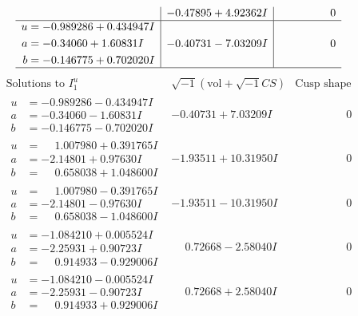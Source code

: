 \documentclass[1p]{elsarticle_modified}
\theoremstyle{definition}
\newcommand{\I}{\sqrt{-1}}
\begin{document}
$$\begin{array}{c|c|c}
 & -0.47895 + 4.92362 I & \phantom{-0.000000 } 0 \\ \hline\begin{aligned}
u &= -0.989286 + 0.434947 I \\
a &= -0.34060 + 1.60831 I \\
b &= -0.146775 + 0.702020 I\end{aligned}
 & -0.40731 - 7.03209 I & \phantom{-0.000000 } 0\\
 \hline 
 \end{array}$$\newpage$$\begin{array}{c|c|c}  
\text{Solutions to }I^u_{1}& \I (\text{vol} + \sqrt{-1}CS) & \text{Cusp shape}\\
 \hline 
\begin{aligned}
u &= -0.989286 - 0.434947 I \\
a &= -0.34060 - 1.60831 I \\
b &= -0.146775 - 0.702020 I\end{aligned}
 & -0.40731 + 7.03209 I & \phantom{-0.000000 } 0 \\ \hline\begin{aligned}
u &= \phantom{-}1.007980 + 0.391765 I \\
a &= -2.14801 + 0.97630 I \\
b &= \phantom{-}0.658038 + 1.048600 I\end{aligned}
 & -1.93511 + 10.31950 I & \phantom{-0.000000 } 0 \\ \hline\begin{aligned}
u &= \phantom{-}1.007980 - 0.391765 I \\
a &= -2.14801 - 0.97630 I \\
b &= \phantom{-}0.658038 - 1.048600 I\end{aligned}
 & -1.93511 - 10.31950 I & \phantom{-0.000000 } 0 \\ \hline\begin{aligned}
u &= -1.084210 + 0.005524 I \\
a &= -2.25931 + 0.90723 I \\
b &= \phantom{-}0.914933 - 0.929006 I\end{aligned}
 & \phantom{-}0.72668 - 2.58040 I & \phantom{-0.000000 } 0 \\ \hline\begin{aligned}
u &= -1.084210 - 0.005524 I \\
a &= -2.25931 - 0.90723 I \\
b &= \phantom{-}0.914933 + 0.929006 I\end{aligned}
 & \phantom{-}0.72668 + 2.58040 I & \phantom{-0.000000 } 0 \\ \hline\begin{aligned}

\end{aligned}
\end{array}$$
\end{document}
